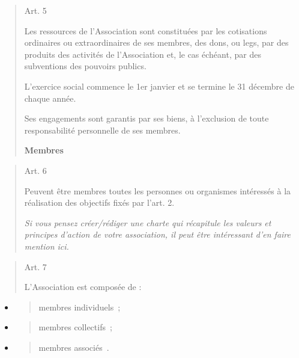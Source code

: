 \documentclass[10pt]{article}
\begin{document}
\begin{quote}
Art. 5

Les ressources de l'Association sont constituées par les cotisations
ordinaires ou extraordinaires de ses membres, des dons, ou legs, par des
produits des activités de l'Association et, le cas échéant, par des
subventions des pouvoirs publics.

L'exercice social commence le 1er janvier et se termine le 31 décembre
de chaque année.

Ses engagements sont garantis par ses biens, à l'exclusion de toute
responsabilité personnelle de ses membres.

\textbf{Membres}

\end{quote}
\begin{quote}
Art. 6

Peuvent être membres toutes les personnes ou organismes intéressés à la
réalisation des objectifs fixés par l'art. 2.

\emph{Si vous pensez créer/rédiger une charte qui récapitule les valeurs
et principes d'action de votre association, il peut être intéressant
d'en faire mention ici.}

\end{quote}
\begin{quote}
Art. 7

L'Association est composée de :
\end{quote}

\begin{itemize}
\item
  \begin{quote}
  membres individuels~;
  \end{quote}
\item
  \begin{quote}
  membres collectifs~;
  \end{quote}
\item
  \begin{quote}
  membres associés~.
  \end{quote}
\end{itemize}
\end{document}

